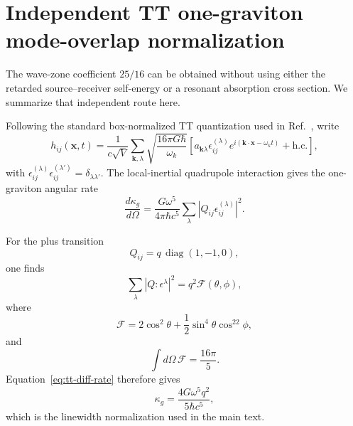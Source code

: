 \section{Independent TT one-graviton mode-overlap normalization}
\label{app:tt-overlap}

The wave-zone coefficient $25/16$ can be obtained without using either the retarded source--receiver self-energy or a resonant absorption cross section. We summarize that independent route here.

Following the standard box-normalized TT quantization used in Ref.~\cite{BoughnRothman2006}, write
\begin{equation}
h_{ij}(\mathbf x,t)
=\frac{1}{c\sqrt V}
\sum_{\mathbf k,\lambda}
\sqrt{\frac{16\pi G\hbar}{\omega_k}}
\left[
a_{\mathbf k\lambda}
\epsilon^{(\lambda)}_{ij}
 e^{i(\mathbf k\cdot\mathbf x-\omega_k t)}
+\mathrm{h.c.}
\right],
\end{equation}
with $\epsilon^{(\lambda)}_{ij}\epsilon^{(\lambda')}_{ij}=\delta_{\lambda\lambda'}$. The local-inertial quadrupole interaction gives the one-graviton angular rate
\begin{equation}
\frac{d\kappa_g}{d\Omega}
=\frac{G\omega^5}{4\pi\hbar c^5}
\sum_\lambda
|Q_{ij}\epsilon^{(\lambda)}_{ij}|^2.
\label{eq:tt-diff-rate}
\end{equation}

For the plus transition
\begin{equation}
Q_{ij}=q\,\operatorname{diag}(1,-1,0),
\end{equation}
one finds
\begin{equation}
\sum_\lambda|Q:\epsilon^\lambda|^2
=q^2\mathcal F(\theta,\phi),
\end{equation}
where
\begin{equation}
\mathcal F
=2\cos^2\theta
+\frac12\sin^4\theta\cos^22\phi,
\end{equation}
and
\begin{equation}
\int d\Omega\,\mathcal F=\frac{16\pi}{5}.
\end{equation}
Equation~\eqref{eq:tt-diff-rate} therefore gives
\begin{equation}
\kappa_g
=\frac{4G\omega^5q^2}{5\hbar c^5},
\end{equation}
which is the linewidth normalization used in the main text.

